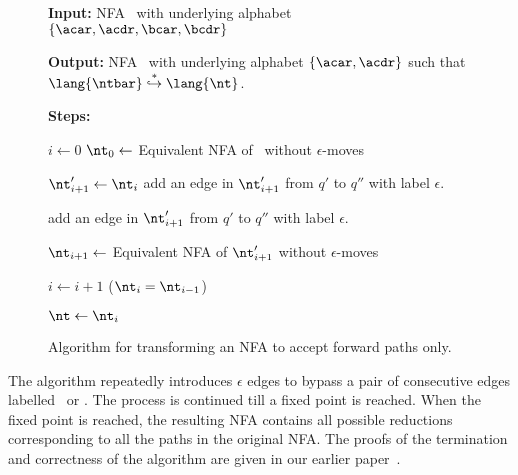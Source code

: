 \documentclass{llncs}
\begin{document}
\begin{figure}[t]
\begin{boxedminipage}{\textwidth}
\begin{center}
  \raggedright  {\bf  Input:}  NFA \ntbar\  with  underlying
  alphabet $\lbrace \acar, \acdr, \bcar, \bcdr\rbrace$ \\
%
  \raggedright{\bf Output:} NFA  \nt\ with  underlying
  alphabet $\lbrace \acar, \acdr \rbrace$ such that
  $\lang{\ntbar} \stackrel{*}{\hookrightarrow} \lang{\nt}$.
  \\
%  
  
  \raggedright{\bf Steps:}
 \begin{algorithmic}
   \STATE $i \leftarrow 0$ 
   \STATE $\nt_0 \leftarrow$ Equivalent NFA of \ntbar\
   without $\epsilon$-moves \cite{hopcraft90toc}

   \REPEAT
   \STATE $\nt'_{i+1} \leftarrow \nt_i$
   \STATE add an edge in $\nt'_{i+1}$ from $q'$ to $q''$ with
   label $\epsilon$.
   \ENDFOR

   \STATE add an edge in $\nt'_{i+1}$ from $q'$ to $q''$ with
     label $\epsilon$.
   \ENDFOR
   
   \STATE   $\nt_{i+1}    \leftarrow$   Equivalent   NFA   of
   $\nt'_{i+1}$ without $\epsilon$-moves

   \STATE $i \leftarrow i+1$
   \UNTIL ($\nt_{i} = \nt_{i-1}$)
   
   \STATE $\nt \leftarrow \nt_i$
 \end{algorithmic}
\end{center}
\end{boxedminipage}
 \caption{Algorithm for transforming an NFA to  accept forward
   paths only.}\label{algo:simplify-NFA} \figrule
\end{figure}
The algorithm repeatedly introduces  $\epsilon$ edges to bypass a
pair of consecutive edges labelled \bcar\acar\ or \bcdr\acdr.  The
process is  continued till  a fixed point  is reached.   When the
fixed point  is reached, the resulting NFA  contains all possible
reductions corresponding  to all the  paths in the  original NFA.
The proofs  of the termination  and correctness of  the algorithm
are given in our earlier paper~\cite{karkare07liveness}.
\end{document}
